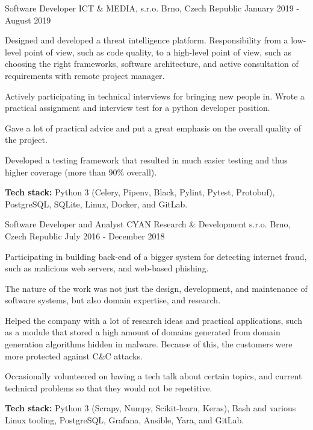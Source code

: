 \begin{cventries}

 \cventry
    {Software Developer}
    {ICT \& MEDIA, s.r.o.}
    {Brno, Czech Republic}
    {January 2019 - August 2019}
    {
      \begin{cvitems}
      	\item {Designed and developed a threat intelligence platform. Responsibility from a low-level point of view, such as code quality, to a high-level point of view, such as choosing the right frameworks, software architecture, and active consultation of requirements with remote project manager.}
        \item {Actively participating in technical interviews for bringing new people in. Wrote a practical assignment and interview test for a python developer position.}
        \item {Gave a lot of practical advice and put a great emphasis on the overall quality of the project.}
        \item {Developed a testing framework that resulted in much easier testing and thus higher coverage (more than 90\% overall).}
        \item {{\fontsize{11.2pt}{1em}\bodyfont\bfseries\color{darktext}Tech stack:} Python 3 (Celery, Pipenv, Black, Pylint, Pytest, Protobuf), PostgreSQL, SQLite, Linux, Docker, and GitLab.}
      \end{cvitems}
    }

 \cventry
    {Software Developer and Analyst}
    {CYAN Research \& Development s.r.o.}
    {Brno, Czech Republic}
    {July 2016 - December 2018}
    {
      \begin{cvitems}
      	\item {Participating in building back-end of a bigger system for detecting internet fraud, such as malicious web servers, and web-based phishing.}
   	   \item {The nature of the work was not just the design, development, and maintenance of software systems, but also domain expertise, and research.}
        \item {Helped the company with a lot of research ideas and practical applications, such as a module that stored a high amount of domains generated from domain generation algorithms hidden in malware. Because of this, the customers were more protected against C\&C attacks.}
        \item {Occasionally volunteered on having a tech talk about certain topics, and current technical problems so that they would not be repetitive.}
        \item {{\fontsize{11.2pt}{1em}\bodyfont\bfseries\color{darktext}Tech stack:} Python 3 (Scrapy, Numpy, Scikit-learn, Keras), Bash and various Linux tooling, PostgreSQL, Grafana, Ansible, Yara, and GitLab.}
      \end{cvitems}
    }
    

\end{cventries}
